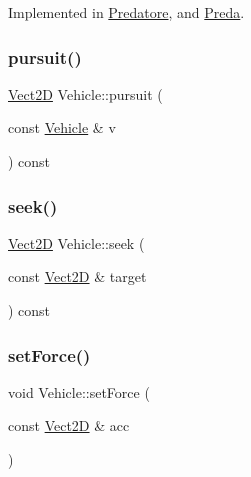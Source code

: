 Implemented in \hyperlink{classPredatore_a5633b0cdab96d56d7d0aca7f7b046ac6_a5633b0cdab96d56d7d0aca7f7b046ac6}{Predatore}, and \hyperlink{classPreda_a38ba49e7ab329e8ebbf23f242d3dd084_a38ba49e7ab329e8ebbf23f242d3dd084}{Preda}.

\mbox{\label{classVehicle_a9dd4f4a06b4abd3324d317c27bb867d2_a9dd4f4a06b4abd3324d317c27bb867d2}} 
\subsubsection{\texorpdfstring{pursuit()}{pursuit()}}
{\footnotesize\ttfamily \hyperlink{classVect2D}{Vect2D} Vehicle\+::pursuit (\begin{DoxyParamCaption}\item[{const \hyperlink{classVehicle}{Vehicle} \&}]{v }\end{DoxyParamCaption}) const\hspace{0.3cm}{\ttfamily [inherited]}}

\mbox{\label{classVehicle_a86c0b5ddcf64443bc090657cd29832bf_a86c0b5ddcf64443bc090657cd29832bf}} 
\subsubsection{\texorpdfstring{seek()}{seek()}}
{\footnotesize\ttfamily \hyperlink{classVect2D}{Vect2D} Vehicle\+::seek (\begin{DoxyParamCaption}\item[{const \hyperlink{classVect2D}{Vect2D} \&}]{target }\end{DoxyParamCaption}) const\hspace{0.3cm}{\ttfamily [inherited]}}

\mbox{\label{classVehicle_a03e22c522e6f526f95428c81d0762833_a03e22c522e6f526f95428c81d0762833}} 
\subsubsection{\texorpdfstring{set\+Force()}{setForce()}}
{\footnotesize\ttfamily void Vehicle\+::set\+Force (\begin{DoxyParamCaption}\item[{const \hyperlink{classVect2D}{Vect2D} \&}]{acc }\end{DoxyParamCaption})\hspace{0.3cm}{\ttfamily [inherited]}}


